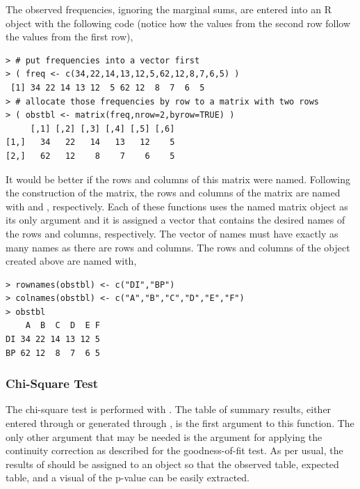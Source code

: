\documentclass[10pt,openany]{book}\usepackage[]{graphicx}\usepackage[]{color}
\makeatletter
\newenvironment{kframe}{%
 \def\at@end@of@kframe{}%
 \ifinner\ifhmode%
  \def\at@end@of@kframe{\end{minipage}}%
  \begin{minipage}{\columnwidth}%
 \fi\fi%
 \def\FrameCommand##1{\hskip\@totalleftmargin \hskip-\fboxsep
 \colorbox{shadecolor}{##1}\hskip-\fboxsep
     \hskip-\linewidth \hskip-\@totalleftmargin \hskip\columnwidth}%
 \MakeFramed {\advance\hsize-\width
   \@totalleftmargin\z@ \linewidth\hsize
   \@setminipage}}%
 {\par\unskip\endMakeFramed%
 \at@end@of@kframe}
\newenvironment{knitrout}{}{} %
\makeatother
\begin{document}
The observed frequencies, ignoring the marginal sums, are entered into an R object with the following code (notice how the values from the second row follow the values from the first row),
\begin{knitrout}
\color{fgcolor}\begin{kframe}
\begin{verbatim}
> # put frequencies into a vector first
> ( freq <- c(34,22,14,13,12,5,62,12,8,7,6,5) )
 [1] 34 22 14 13 12  5 62 12  8  7  6  5
> # allocate those frequencies by row to a matrix with two rows
> ( obstbl <- matrix(freq,nrow=2,byrow=TRUE) )
     [,1] [,2] [,3] [,4] [,5] [,6]
[1,]   34   22   14   13   12    5
[2,]   62   12    8    7    6    5
\end{verbatim}
\end{kframe}
\end{knitrout}
It would be better if the rows and columns of this matrix were named.  Following the construction of the matrix, the rows and columns of the matrix are named with  and , respectively.  Each of these functions uses the named matrix object as its only argument and it is assigned a vector that contains the desired names of the rows and columns, respectively.  The vector of names must have exactly as many names as there are rows and columns.  The rows and columns of the  object created above are named with,
\begin{knitrout}
\color{fgcolor}\begin{kframe}
\begin{verbatim}
> rownames(obstbl) <- c("DI","BP")
> colnames(obstbl) <- c("A","B","C","D","E","F")
> obstbl
    A  B  C  D  E F
DI 34 22 14 13 12 5
BP 62 12  8  7  6 5
\end{verbatim}
\end{kframe}
\end{knitrout}

\subsubsection{Chi-Square Test}
The chi-square test is performed with .  The table of summary results, either entered through  or generated through , is the first argument to this function.  The only other argument that may be needed is the  argument for applying the continuity correction as described for the goodness-of-fit test.  As per usual, the results of  should be assigned to an object so that the observed table, expected table, and a visual of the p-value can be easily extracted.
\end{document}
